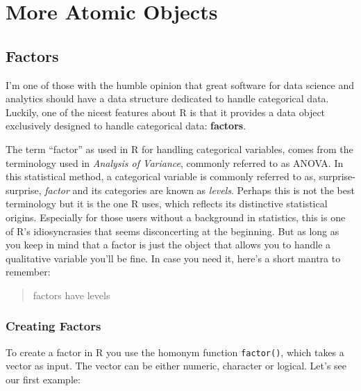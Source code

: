 \documentclass[
]{book}
\begin{document}
\hypertarget{part-more-atomic-objects}{%
\part{More Atomic Objects}\label{part-more-atomic-objects}}

\hypertarget{factors}{%
\chapter{Factors}\label{factors}}

I'm one of those with the humble opinion that great software for data science
and analytics should have a data structure dedicated to handle categorical data.
Luckily, one of the nicest features about R is that it provides a data
object exclusively designed to handle categorical data: \textbf{factors}.

The term ``factor'' as used in R for handling categorical variables, comes from
the terminology used in \emph{Analysis of Variance}, commonly referred to as ANOVA.
In this statistical method, a categorical variable is commonly referred to as,
surprise-surprise, \emph{factor} and its categories are known as \emph{levels}. Perhaps
this is not the best terminology but it is the one R uses, which reflects its
distinctive statistical origins. Especially for those users without a background
in statistics, this is one of R's idiosyncrasies that seems disconcerting at
the beginning. But as long as you keep in mind that a factor is just the object
that allows you to handle a qualitative variable you'll be fine. In case you
need it, here's a short mantra to remember:

\begin{quote}
factors have levels
\end{quote}

\hypertarget{creating-factors}{%
\section{Creating Factors}\label{creating-factors}}

To create a factor in R you use the homonym function \texttt{factor()}, which takes a
vector as input. The vector can be either numeric, character or logical. Let's
see our first example:
\end{document}
